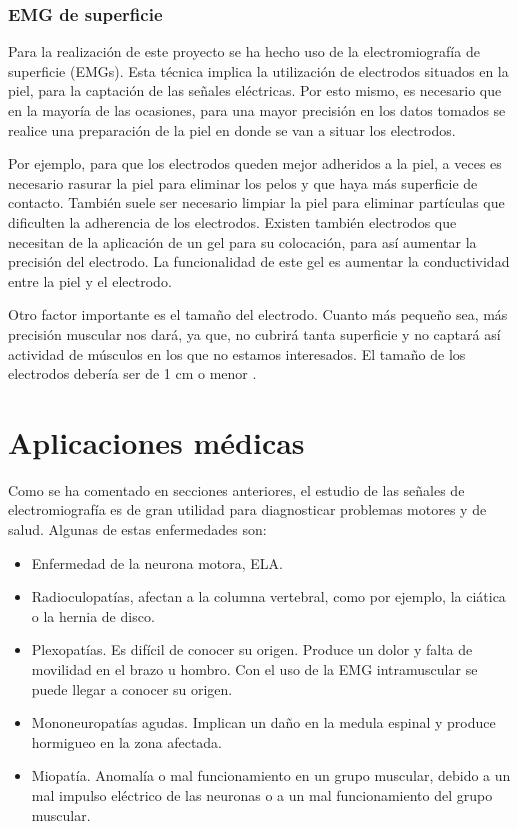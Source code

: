 \subsubsection{EMG de superficie}
Para la realización de este proyecto se ha hecho uso de la electromiografía de superficie (EMGs). Esta técnica implica la utilización de electrodos situados en la piel, para la captación de las señales eléctricas. Por esto mismo, es necesario que en la mayoría de las ocasiones, para una mayor precisión en los datos tomados se realice una preparación de la piel en donde se van a situar los electrodos.

Por ejemplo, para que los electrodos queden mejor adheridos a la piel, a veces es necesario rasurar la piel para eliminar los pelos y que haya más superficie de contacto. También suele ser necesario limpiar la piel para eliminar partículas que dificulten la adherencia de los electrodos. Existen también electrodos que necesitan de la aplicación de un gel para su colocación, para así aumentar la precisión del electrodo. La funcionalidad de este gel es aumentar la conductividad entre la piel y el electrodo.

Otro factor importante es el tamaño del electrodo. Cuanto más pequeño sea, más precisión muscular nos dará, ya que, no cubrirá tanta superficie y no captará así actividad de músculos en los que no estamos interesados. El tamaño de los electrodos debería ser de 1 cm o menor \cite{konrad2005abc}.
\section{Aplicaciones médicas}
Como se ha comentado en secciones anteriores, el estudio de las señales de electromiografía es de gran utilidad para diagnosticar problemas motores y de salud. Algunas de estas enfermedades son: \cite{luzar2005electromiografia}
\begin{itemize}
\item Enfermedad de la neurona motora, ELA.
\item Radioculopatías, afectan a la columna vertebral, como por ejemplo, la ciática o la hernia de disco.
\item Plexopatías. Es difícil de conocer su origen. Produce un dolor y falta de movilidad en el brazo u hombro. Con el uso de la EMG intramuscular se puede llegar a conocer su origen.
\item Mononeuropatías agudas. Implican un daño en la medula espinal y produce hormigueo en la zona afectada.
\item Miopatía. Anomalía o mal funcionamiento en un grupo muscular, debido a un mal impulso eléctrico de las neuronas o a un mal funcionamiento del grupo muscular.
\end{itemize}

